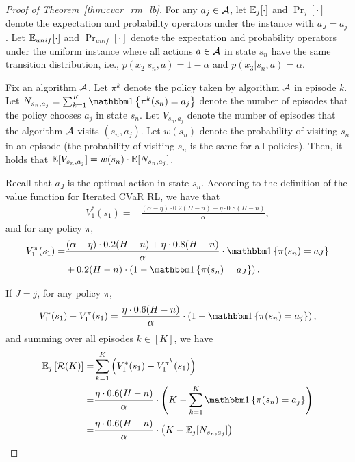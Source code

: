 \begin{proof}[Proof of Theorem~\ref{thm:cvar_rm_lb}]
{		For any $a_j \in \mathcal{A}$, let $\mathbb{E}_j[\cdot]$ and $\Pr_j[\cdot]$ denote the expectation and probability operators under the instance with $a_J=a_j$.
		Let $\mathbb{E}_{unif}[\cdot]$ and $\Pr_{unif}[\cdot]$ denote the expectation and probability operators under the uniform instance where all actions $a \in \mathcal{A}$ in state $s_n$ have the same transition distribution, i.e., $p(x_2|s_n,a)=1-\alpha$ and $p(x_3|s_n,a)=\alpha$.
		
		Fix an algorithm $\mathcal{A}$. 
		Let $\pi^k$ denote the policy taken by algorithm $\mathcal{A}$ in episode $k$.
		Let $N_{s_n,a_j}=\sum_{k=1}^{K} \indicator{\pi^k(s_n)=a_j}$ denote the number of episodes that the policy chooses $a_j$ in state $s_n$.
		Let $V_{s_n,a_j}$ denote the number of episodes that the algorithm $\mathcal{A}$ visits $(s_n,a_j)$. 
		Let $w(s_n)$ denote the probability of visiting $s_n$ in an episode (the probability of visiting $s_n$ is the same for all policies). 
		Then, it holds that $\mathbb{E}[V_{s_n,a_j}]=w(s_n) \cdot \mathbb{E}[N_{s_n,a_j}]$.
		
		Recall that $a_J$ is the optimal action in state $s_n$.
		According to the definition of the value function for Iterated CVaR RL,
		we have that
		\begin{align*}
			V^{*}_1(s_1) = &  \frac{(\alpha-\eta)\cdot 0.2(H-n)+\eta \cdot 0.8(H-n)}{\alpha} ,
		\end{align*}
		and for any policy $\pi$,
		\begin{align*}
			V^{\pi}_1(s_1) = &  \frac{(\alpha-\eta)\cdot 0.2(H-n)+\eta \cdot 0.8(H-n)}{\alpha} \cdot \indicator{\pi(s_n)=a_{J}} \\& +   0.2(H-n) \cdot \sbr{1-\indicator{\pi(s_n)=a_{J}}} .
		\end{align*}
		
		If $J=j$, for any policy $\pi$,
		\begin{align}
			V^{*}_1(s_1) - V^{\pi}_1(s_1) = \frac{\eta \cdot 0.6(H-n)}{\alpha} \cdot \sbr{1-\indicator{\pi(s_n)=a_{j}}} , \label{eq:lb_proof_suboptimality}
		\end{align}
		and summing over all episodes $k \in [K]$, we have
		\begin{align*}
			\ex_j \mbr{\cR(K)} = & \sum_{k=1}^{K} \sbr{V^{*}_1(s_1)-V^{\pi^k}_1(s_1)}
			\\
			= & \frac{\eta \cdot 0.6(H-n)}{\alpha} \cdot \sbr{K - \sum_{k=1}^{K} \indicator{\pi(s_n)=a_{j}}} 
			\\
			= & \frac{\eta \cdot 0.6(H-n)}{\alpha} \cdot \sbr{K - \ex_j[N_{s_n,a_j}]} 
		\end{align*}
		
}
\end{proof}
